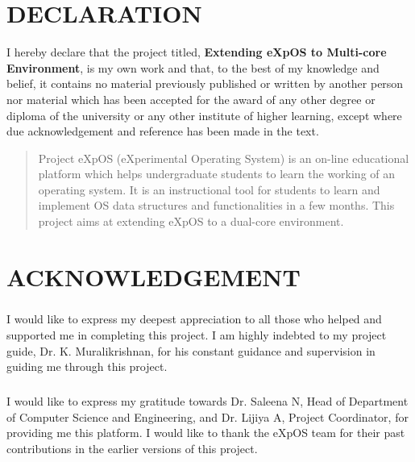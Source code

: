 \documentclass[12pt]{report}
\begin{document}
\begin{spacing}{1.01}
{{\begin{tabular}{p{4.5cm}cp{4.5cm}}
\end{tabular}
}
}
\chapter*{DECLARATION}
I hereby declare that the project titled, \textbf{Extending eXpOS to Multi-core Environment}, is my own work and that, to the best of my knowledge and belief, it contains no material previously published or written by another person nor material which has been accepted for the award of any other degree or diploma of the university or any other institute of higher learning, except where due acknowledgement and reference has been made in the text.\\

\vspace{2cm}
\newpage 

\begin{abstract}
Project eXpOS (eXperimental Operating System) is an on-line educational platform which helps undergraduate students to learn the working of an operating system. It is an instructional tool for students to learn and implement OS data structures and functionalities in a few months. This project aims at extending eXpOS to a dual-core environment.
\end{abstract}

\chapter*{\rm \large \bf ACKNOWLEDGEMENT}
\paragraph{}
I would like to express my deepest appreciation to all those who helped and supported me in completing this project. I am highly indebted to my project guide, Dr. K. Muralikrishnan, for his constant guidance and supervision in guiding me through this project.

\paragraph{}
I would like to express my gratitude towards Dr. Saleena N, Head of Department of Computer Science and Engineering, and Dr. Lijiya A, Project Coordinator, for providing me this platform. I would like to thank the eXpOS team for their past contributions in the earlier versions of this project.


\end{spacing}
\end{document}
